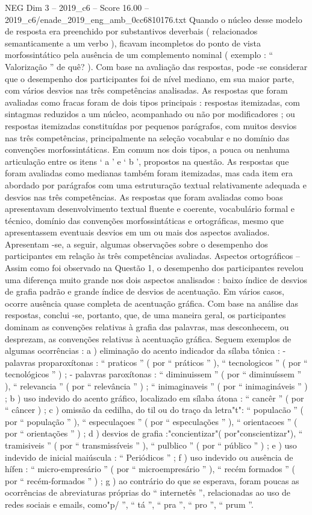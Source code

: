 \begin{textsample}{NEG Dim 3 – 2019\_c6 – Score 16.00 – 2019\_c6/enade\_2019\_eng\_amb\_0cc6810176.txt}
Quando o núcleo desse modelo de resposta era preenchido por substantivos deverbais ( relacionados semanticamente a um verbo ), ficavam incompletos do ponto de vista morfossintático pela ausência de um complemento nominal ( exemplo : “ Valorização ” de quê? ).
Com base na avaliação das respostas, pode -se considerar que o desempenho dos participantes foi de nível mediano, em sua maior parte, com vários desvios nas três competências analisadas.
As respostas que foram avaliadas como fracas foram de dois tipos principais : respostas itemizadas, com sintagmas reduzidos a um núcleo, acompanhado ou não por modificadores ; ou respostas itemizadas constituídas por pequenos parágrafos, com muitos desvios nas três competências, principalmente na seleção vocabular e no domínio das convenções morfossintáticas.
Em comum nos dois tipos, a pouca ou nenhuma articulação entre os itens ‘ a ’ e ‘ b ’, propostos na questão.
As respostas que foram avaliadas como medianas também foram itemizadas, mas cada item era abordado por parágrafos com uma estruturação textual relativamente adequada e desvios nas três competências.
As respostas que foram avaliadas como boas apresentavam desenvolvimento textual fluente e coerente, vocabulário formal e técnico, domínio das convenções morfossintáticas e ortográficas, mesmo que apresentassem eventuais desvios em um ou mais dos aspectos avaliados.
Apresentam -se, a seguir, algumas observações sobre o desempenho dos participantes em relação às três competências avaliadas.
Aspectos ortográficos – Assim como foi observado na Questão 1, o desempenho dos participantes revelou uma diferença muito grande nos dois aspectos analisados : baixo índice de desvios de grafia padrão e grande índice de desvios de acentuação.
Em vários casos, ocorre ausência quase completa de acentuação gráfica.
Com base na análise das respostas, conclui -se, portanto, que, de uma maneira geral, os participantes dominam as convenções relativas à grafia das palavras, mas desconhecem, ou desprezam, as convenções relativas à acentuação gráfica.
Seguem exemplos de algumas ocorrências : a ) eliminação do acento indicador da sílaba tônica : - palavras proparoxítonas : “ praticos ” ( por “ práticos ” ), “ tecnologicos ” ( por “ tecnológicos ” ) ; - palavras paroxítonas : “ diminuissem ” ( por “ diminuíssem ” ), “ relevancia ” ( por “ relevância ” ) ; “ inimaginaveis ” ( por “ inimagináveis ” ) ; b ) uso indevido do acento gráfico, localizado em sílaba átona : “ cancêr ” ( por “ câncer ) ; c ) omissão da cedilha, do til ou do traço da letra"t": “ populacão ” ( por “ população ” ), “ especulaçoes ” ( por “ especulações ” ), “ orientacoes ” ( por “ orientações ” ) ; d ) desvios de grafia :"concientizar"( por"conscientizar"), “ tramisiveis ” ( por “ transmissíveis ” ), “ pulblico ” ( por “ público ” ) ; e ) uso indevido de inicial maiúscula : “ Periódicos ” ; f ) uso indevido ou ausência de hífen : “ micro-empresário ” ( por “ microempresário ” ), “ recém formados ” ( por “ recém-formados ” ) ; g ) ao contrário do que se esperava, foram poucas as ocorrências de abreviaturas próprias do “ internetês ”, relacionadas ao uso de redes sociais e emails, como"p/ ”, “ tá ”, “ pra ”, “ pro ”, “ prum ”.

\end{textsample}
